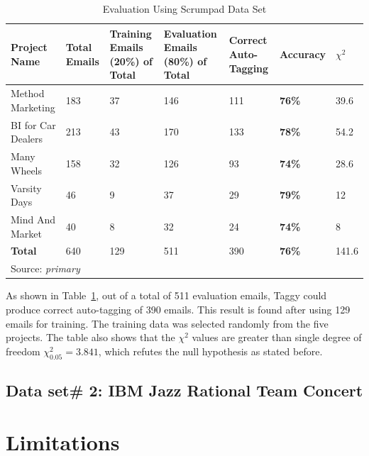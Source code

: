 \begin{table}
	\label{tab:sp_evaluation}
  \centering
  \caption{Evaluation Using Scrumpad Data Set}
    \begin{tabular}{|p{2cm}|p{2cm}|p{2cm}|p{2cm}|p{2cm}|p{2cm}|p{2cm}|}
      \hline
      \textbf{Project Name} & \textbf{Total Emails} & \textbf{Training Emails (20\%) of Total} & \textbf{Evaluation Emails (80\%)  of Total} & \textbf{Correct Auto-Tagging} & \textbf{Accuracy} & $\chi^{2}$\\
      \hline
      Method Marketing & 183 		& 37	& 146	&	111 & \textbf{76\%}	& 39.6\\
      \hline
      BI for Car Dealers & 213 	& 43	& 170	&	133	& \textbf{78\%}	& 54.2\\
      \hline
      Many Wheels & 158 				& 32	& 126	& 93	& \textbf{74\%}	& 28.6\\
      \hline
      Varsity Days & 46 				& 9		&	37	& 29	& \textbf{79\%}	& 12\\
      \hline
      Mind And Market & 40 			& 8		& 32	&	24	& \textbf{74\%}	& 8\\
      \hline
      \textbf{Total} & 640 			& 129	& 511	&	390	& \textbf{76\%}	& 141.6\\
      \hline
      \multicolumn{5}{l}{Source: \emph{primary}}
    \end{tabular}
\end{table}

As shown in Table~\ref{tab:sp_evaluation}, out of a total of 511 evaluation emails, Taggy could produce correct auto-tagging of 390 emails. This result is found after using 129 emails for training. The training data was selected randomly from the five projects. The table also shows that the $\chi^{2}$ values are greater than single degree of freedom $\chi^{2}_{0.05} = 3.841$, which refutes the null hypothesis as stated before.



\subsection{Data set\# 2: IBM Jazz Rational Team Concert}
\section{Limitations}
	
